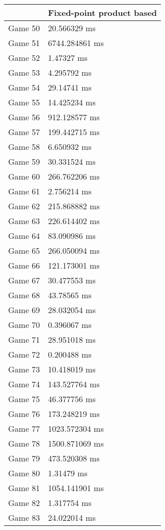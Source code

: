 \begin{tabular}{|l|l|}
	\hline
	& Fixed-point product based \\ \hline
	Game 50 & 20.566329 ms \\ \hline
	Game 51 & 6744.284861 ms \\ \hline
	Game 52 & 1.47327 ms \\ \hline
	Game 53 & 4.295792 ms \\ \hline
	Game 54 & 29.14741 ms \\ \hline
	Game 55 & 14.425234 ms \\ \hline
	Game 56 & 912.128577 ms \\ \hline
	Game 57 & 199.442715 ms \\ \hline
	Game 58 & 6.650932 ms \\ \hline
	Game 59 & 30.331524 ms \\ \hline
	Game 60 & 266.762206 ms \\ \hline
	Game 61 & 2.756214 ms \\ \hline
	Game 62 & 215.868882 ms \\ \hline
	Game 63 & 226.614402 ms \\ \hline
	Game 64 & 83.090986 ms \\ \hline
	Game 65 & 266.050094 ms \\ \hline
	Game 66 & 121.173001 ms \\ \hline
	Game 67 & 30.477553 ms \\ \hline
	Game 68 & 43.78565 ms \\ \hline
	Game 69 & 28.032054 ms \\ \hline
	Game 70 & 0.396067 ms \\ \hline
	Game 71 & 28.951018 ms \\ \hline
	Game 72 & 0.200488 ms \\ \hline
	Game 73 & 10.418019 ms \\ \hline
	Game 74 & 143.527764 ms \\ \hline
	Game 75 & 46.377756 ms \\ \hline
	Game 76 & 173.248219 ms \\ \hline
	Game 77 & 1023.572304 ms \\ \hline
	Game 78 & 1500.871069 ms \\ \hline
	Game 79 & 473.520308 ms \\ \hline
	Game 80 & 1.31479 ms \\ \hline
	Game 81 & 1054.141901 ms \\ \hline
	Game 82 & 1.317754 ms \\ \hline
	Game 83 & 24.022014 ms \\ \hline

\end{tabular}
